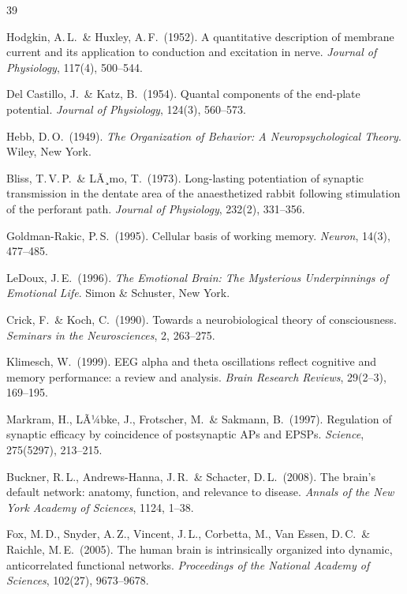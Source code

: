 ﻿\documentclass[12pt,a4paper]{report}
\theoremstyle{plain}
\theoremstyle{definition}
\theoremstyle{remark}
\begin{document}
	
	\begin{thebibliography}{39}
		
		Hodgkin, A.\,L.\ \& Huxley, A.\,F.\ (1952).
		A quantitative description of membrane current and its application to
		conduction and excitation in nerve.
		\textit{Journal of Physiology}, 117(4), 500--544.
		
		Del Castillo, J.\ \& Katz, B.\ (1954).
		Quantal components of the end-plate potential.
		\textit{Journal of Physiology}, 124(3), 560--573.
		
		Hebb, D.\,O.\ (1949).
		\textit{The Organization of Behavior: A Neuropsychological Theory}.
		Wiley, New York.
		
		Bliss, T.\,V.\,P.\ \& LÃ¸mo, T.\ (1973).
		Long-lasting potentiation of synaptic transmission in the dentate area
		of the anaesthetized rabbit following stimulation of the perforant path.
		\textit{Journal of Physiology}, 232(2), 331--356.
		
		Goldman-Rakic, P.\,S.\ (1995).
		Cellular basis of working memory.
		\textit{Neuron}, 14(3), 477--485.
		
		LeDoux, J.\,E.\ (1996).
		\textit{The Emotional Brain: The Mysterious Underpinnings of Emotional Life}.
		Simon \& Schuster, New York.
		
		Crick, F.\ \& Koch, C.\ (1990).
		Towards a neurobiological theory of consciousness.
		\textit{Seminars in the Neurosciences}, 2, 263--275.
		
		Klimesch, W.\ (1999).
		EEG alpha and theta oscillations reflect cognitive and memory performance:
		a review and analysis.
		\textit{Brain Research Reviews}, 29(2--3), 169--195.
		
		Markram, H., LÃ¼bke, J., Frotscher, M.\ \& Sakmann, B.\ (1997).
		Regulation of synaptic efficacy by coincidence of postsynaptic APs and EPSPs.
		\textit{Science}, 275(5297), 213--215.
		
		Buckner, R.\,L., Andrews-Hanna, J.\,R.\ \& Schacter, D.\,L.\ (2008).
		The brain's default network: anatomy, function, and relevance to disease.
		\textit{Annals of the New York Academy of Sciences}, 1124, 1--38.
		
		Fox, M.\,D., Snyder, A.\,Z., Vincent, J.\,L., Corbetta, M.,
		Van Essen, D.\,C.\ \& Raichle, M.\,E.\ (2005).
		The human brain is intrinsically organized into dynamic, anticorrelated
		functional networks.
		\textit{Proceedings of the National Academy of Sciences}, 102(27), 9673--9678.
		

\end{thebibliography}
\end{document}
